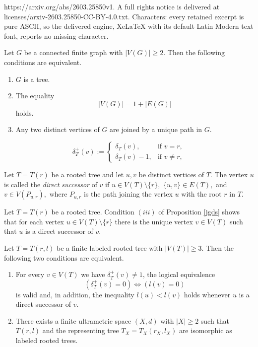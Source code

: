 \documentclass[10pt,a4paper]{amsart}
\begin{document}
https://arxiv.org/abs/2603.25850v1. A full rights notice is delivered at licenses/arxiv-2603.25850-CC-BY-4.0.txt. Characters: every retained excerpt is pure ASCII, so the delivered engine, XeLaTeX with its default Latin Modern text font, reports no missing character.
\begin{Proposition}
\label{jgds}
Let $G$ be a connected finite graph with $|V(G)|\geq 2$. Then the following conditions are equivalent.
\begin{enumerate}
    \item[(i)] $G$ is a tree.

        \item[(ii)] The equality 
\begin{equation*}
    |V(G)|=1+|E(G)|
\end{equation*}
holds.

            \item[(iii)] Any two distinct vertices of $G$ are joined by a unique path in $G$.
\end{enumerate}
\end{Proposition}

\begin{equation}
    \label{zbh1}
\delta_T^{+}(v):=
\begin{cases}
\delta_T(v), & \text{if } v=r,\\
\delta_T(v)-1, & \text{if } v\ne r,
\end{cases}
\end{equation}

\begin{Definition}\label{saqh}
Let $T=T(r)$ be a rooted tree and let $u,v$ be distinct vertices of $T$. 
The vertex $u$ is called the {\it direct successor} of $v$ if
\(
u \in V(T)\setminus\{r\},\) \( \{u,v\}\in E(T),
\)
and
\(
v \in V(P_{u,r}),
\)
where $P_{u,r}$ is the path joining the vertex $u$ with the root $r$ in $T$.
\end{Definition}

\begin{Remark}\label{mnbffss} Let $T=T(r)$ be a rooted tree. Condition $(iii)$ of Proposition \ref{jgds} shows that for each vertex $u\in V(T)\setminus\{r\}$ there is the unique vertex $v\in V(T)$ such that $u$ is a direct successor of $v$.
\end{Remark}

\begin{Theorem}\label{edftt}
Let $T = T(r,l)$ be a finite labeled rooted tree with $|V(T)|\geq 3$. Then the following two conditions are equivalent.
\begin{enumerate}
\item[(i)] For every $v \in V(T)$ we have $\delta_T^{+}(v) \ne 1$, the logical equivalence
\[
(\delta_T^{+}(v)=0) \iff (l(v)=0)
\]
is valid and, in addition, the inequality
\(
l(u) < l(v)
\)
holds whenever $u$ is a direct successor of $v$.
\item[(ii)] There exists a finite  ultrametric space $(X,d)$ with $|X|\geq 2$ such that $T(r,l)$ and the representing tree $T_X=T_X(r_X,l_X)$ are isomorphic as labeled rooted trees.
\end{enumerate}
\end{Theorem}
\end{document}
